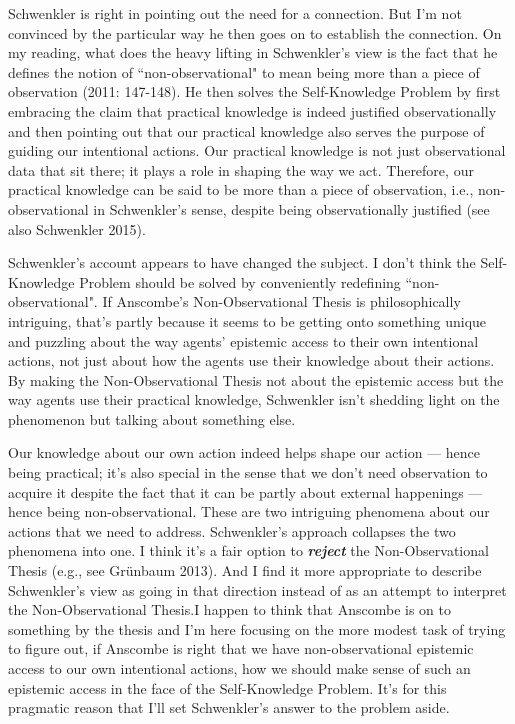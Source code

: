 \documentclass[a4paper,12pt]{article}
\begin{document}
Schwenkler is right in pointing out the need for a connection. But I'm not convinced by the particular way he then goes on to establish the connection. On my reading, what does the heavy lifting in Schwenkler's view is the fact that he defines the notion of ``non-observational" to mean being more than a piece of observation (2011: 147-148). He then solves the Self-Knowledge Problem by first embracing the claim that practical knowledge is indeed justified observationally and then pointing out that our practical knowledge also serves the purpose of guiding our intentional actions. Our practical knowledge is not just observational data that sit there; it plays a role in shaping the way we act. Therefore, our practical knowledge can be said to be more than a piece of observation, i.e., non-observational in Schwenkler's sense, despite being observationally justified (see also Schwenkler 2015).

Schwenkler's account appears to have changed the subject. I don't think the Self-Knowledge Problem should be solved by conveniently redefining ``non-observational". If Anscombe's Non-Observational Thesis is philosophically intriguing, that's partly because it seems to be getting onto something unique and puzzling about the way agents' epistemic access to their own intentional actions, not just about how the agents use their knowledge about their actions. By making the Non-Observational Thesis not about the epistemic access but the way agents use their practical knowledge, Schwenkler isn't shedding light on the phenomenon but talking about something else.

Our knowledge about our own action indeed helps shape our action --- hence being practical; it's also special in the sense that we don't need observation to acquire it despite the fact that it can be partly about external happenings --- hence being non-observational. These are two intriguing phenomena about our actions that we need to address. Schwenkler's approach collapses the two phenomena into one. I think it's a fair option to \textbf{\emph{reject}} the Non-Observational Thesis (e.g., see Gr\"unbaum 2013). And I find it more appropriate to describe Schwenkler's view as going in that direction instead of as an attempt to interpret the Non-Observational Thesis.\footnotemark I happen to think that Anscombe is on to something by the thesis and I'm here focusing on the more modest task of trying to figure out, if Anscombe is right that we have non-observational epistemic access to our own intentional actions, how we should make sense of such an epistemic access in the face of the Self-Knowledge Problem. It's for this pragmatic reason that I'll set Schwenkler's answer to the problem aside.
\end{document}
